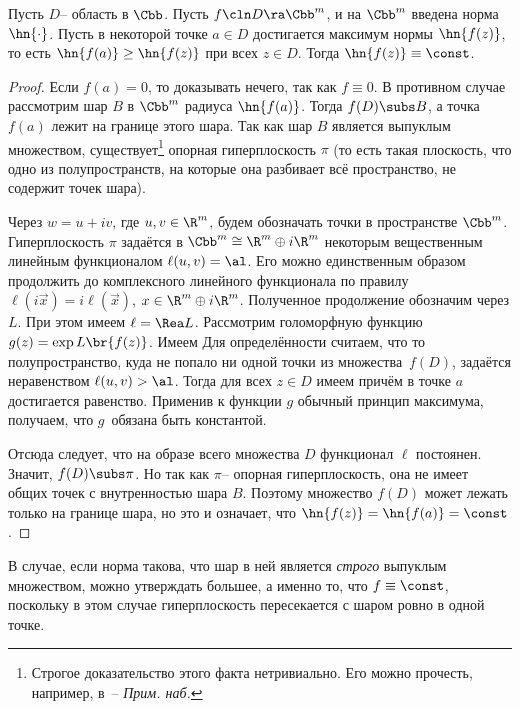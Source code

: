 \documentclass[a4paper]{article}
\begin{document}
\begin{lemma}
Пусть $D$-- область в $\Cbb$. Пусть $f\cln D \ra \Cbb^m$, и на $\Cbb^m$ введена норма $\hn{\cdot}$.
Пусть в некоторой точке $a \in D$ достигается максимум нормы $\hn{f(z)}$, то
есть $\hn{f(a)} \ge \hn{f(z)}$ при всех $z \in D$. Тогда $\hn{f(z)} \equiv \const$.
\end{lemma}
\begin{proof}
Если $f(a) = 0$, то доказывать нечего, так как $f \equiv 0$. В противном случае
рассмотрим шар $B$ в $\Cbb^m$ радиуса $\hn{f(a)}$. Тогда $f(D) \subs B$,
а точка $f(a)$ лежит на границе этого шара.
Так как шар $B$ является выпуклым множеством, существует\footnote{Строгое доказательство
этого факта нетривиально. Его можно прочесть, например,
в~\cite[гл.\,7,~\S\,2,~теорема\,1]{vinberg}-- \emph{Прим. наб.}} опорная
гиперплоскость $\pi$ (то есть такая плоскость, что одно из полупространств,
на которые она разбивает всё пространство, не содержит точек шара).

Через $w = u + i v$, где $u,v \in \R^m$, будем обозначать точки в пространстве $\Cbb^m$.
Гиперплоскость $\pi$ задаётся в $\Cbb^m \cong \R^m \oplus i\R^m$ некоторым вещественным
линейным функционалом $\ell(u,v) = \al$. Его можно единственным образом продолжить до
комплексного линейного функционала по правилу
$\ell(i \vec x) = i\ell(\vec x)$, $x \in \R^m\oplus i\R^m$. Полученное продолжение
обозначим через $L$. При этом имеем $\ell = \Rea L$. Рассмотрим голоморфную
функцию $g(z) = \exp L\br{f(z)}$. Имеем
Для определённости считаем, что то полупространство, куда не попало ни одной точки из
множества~$f(D)$,
задаётся неравенством $\ell(u,v) > \al$. Тогда для всех $z \in D$ имеем
причём в точке $a$ достигается равенство. Применив к функции $g$ обычный принцип максимума,
получаем, что $g$~обязана быть константой.

Отсюда следует, что на образе всего множества $D$ функционал $\ell$ постоянен. Значит,
$f(D) \subs \pi$. Но так как $\pi$-- опорная гиперплоскость, она
не имеет общих точек с внутренностью шара $B$. Поэтому множество $f(D)$ может лежать только
на границе шара, но это и означает, что $\hn{f(z)}=\hn{f(a)} = \const$.
\end{proof}

\begin{note}
В случае, если норма такова, что шар в ней является \emph{строго} выпуклым множеством,
можно утверждать большее, а именно то, что $f \equiv \const$, поскольку в этом случае
гиперплоскость пересекается с шаром ровно в одной точке.
\end{note}
\end{document}
